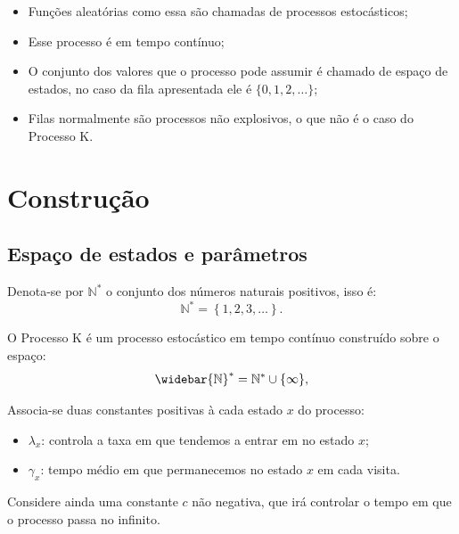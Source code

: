 \documentclass[xcolor=pdftex,dvipsnames]{beamer}
\newcommand{\Nz}{{\mathbb{N^*}}}
\newcommand{\Nzb}{{\mathbb{\widebar{N}^*}}}
\begin{document}
\begin{frame}
  \begin{itemize}
  \item Funções aleatórias como essa são chamadas de processos
    estocásticos;
  \item Esse processo é em tempo contínuo;
  \item O conjunto dos valores que o processo pode assumir é chamado
    de espaço de estados, no caso da fila apresentada ele é $\{0, 1,
    2, \ldots\}$;
  \item Filas normalmente são processos não explosivos, o que não é o
    caso do Processo K.
  \end{itemize}
\end{frame}

\section{Construção}

\subsection{Espaço de estados e parâmetros}

\begin{frame}

  Denota-se por $\Nz$ o conjunto dos números naturais positivos, isso
  é:
  \begin{displaymath}
    \Nz = \left\{ 1, 2, 3, \ldots \right\}.
  \end{displaymath}


  O Processo K é um processo estocástico em tempo contínuo construído
  sobre o espaço:
  \begin{displaymath}
    \Nzb = \Nz \cup \{ \infty \},
  \end{displaymath}


\end{frame}


\begin{frame}

  Associa-se duas constantes positivas à cada estado $x$ do processo:

  \begin{itemize}
  \item $\lambda_x$: controla a taxa em que tendemos a entrar em no
    estado $x$;
    
  \item $\gamma_x$: tempo médio em que permanecemos no estado $x$ em
    cada visita.
  \end{itemize}

  Considere ainda uma constante $c$ não negativa, que irá controlar 
  o tempo em que o processo passa no infinito.

\end{frame}
\end{document}
